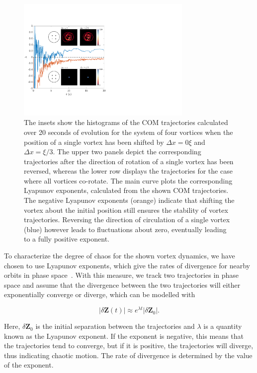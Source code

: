 \begin{figure}
\center \includegraphics[width=0.75\textwidth]{data/2d/lyap/lyap}

\caption{
The insets show the histograms of the COM trajectories calculated over 20 seconds of evolution for the system of four vortices when the position of a single vortex has been shifted by $\Delta x=0\xi$ and $\Delta x=\xi/3$.
The upper two panels depict the corresponding trajectories after the direction of rotation of a single vortex has been reversed, whereas the lower row displays the trajectories for the case where all vortices co-rotate.
The main curve plots the corresponding Lyapunov exponents,  calculated from the shown COM trajectories. 
The negative Lyapunov exponents (orange) indicate that shifting the vortex about the initial position still ensures the stability of vortex trajectories. Reversing the direction of circulation of a single vortex (blue) however leads to fluctuations about zero, eventually leading to a fully positive exponent. 
}
\label{fig:lyap}
\end{figure}


To characterize the degree of chaos for the shown vortex dynamics, we have chosen to use Lyapunov exponents, which give the rates of divergence for nearby orbits in phase space~\cite{wolf1985}.
With this measure, we track two trajectories in phase space and assume that the divergence between the two trajectories will either exponentially converge or diverge, which can be modelled with

\begin{equation}
|\delta\mathbf{Z}(t)| \approx e^{\lambda t} |\delta \mathbf{Z}_0|.
\end{equation}

\noindent Here, $\delta\mathbf{Z}_0$ is the initial separation between the trajectories and $\lambda$ is a quantity known as the Lyapunov exponent.
If the exponent is negative, this means that the trajectories tend to converge, but if it is positive, the trajectories will diverge, thus indicating chaotic motion.
The rate of divergence is determined by the value of the exponent.

